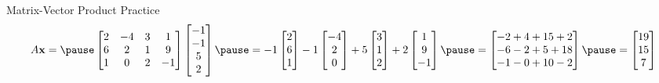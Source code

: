 \documentclass[xcoler=dvipsnames, aspectratio=169]{beamer}
\begin{document}
\begin{frame}{Matrix-Vector Product Practice}
        \[
            A\vec{x} = \pause\begin{bmatrix}
                        2 & -4 & 3 & 1\\
                        6 & 2 & 1 & 9 \\
                        1 & 0 & 2 & -1\\
                \end{bmatrix}\begin{bmatrix}
                    -1\\-1\\5\\2
                \end{bmatrix}\pause = -1\begin{bmatrix}2\\6\\1\end{bmatrix}-1\begin{bmatrix}-4\\2\\0\end{bmatrix}
                    +5\begin{bmatrix}3\\1\\2\end{bmatrix} + 2\begin{bmatrix} 1\\9\\-1\end{bmatrix}
                       \pause = \begin{bmatrix}
                            -2+4+15+2\\
                            -6-2+5+18\\
                            -1-0+10-2
                        \end{bmatrix} \pause= \begin{bmatrix}
                            19\\15\\7
                        \end{bmatrix}
        \]
    \end{frame}
\end{document}
